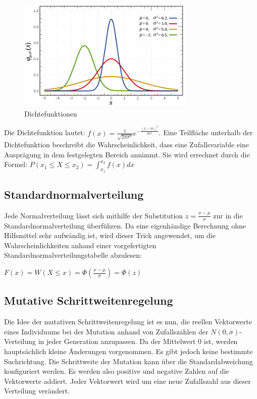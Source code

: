 \begin{figure}[H]
\centering
\includegraphics[width=0.75\textwidth]{img/Glockenkurven.png}
\caption[Dichtefunktionen]{Dichtefunktionen\protect\footnotemark}
\label{fig:glockenkurven}
\end{figure}

Die Dichtefunktion lautet: $f(x) = \frac{1}{\sqrt{2 \pi \sigma^2}} e^{-\frac{(x-m)^2}{2 \sigma^2}}$. Eine Teilfläche unterhalb der Dichtefunktion beschreibt die Wahrscheinlichkeit, dass eine Zufallsvariable eine Ausprägung in dem festgelegten Bereich annimmt. Sie wird errechnet durch die Formel: $P(x_1 \le X \le x_2) = \int_{x_1}^{x_2} f(x) dx$

\subsection{Standardnormalverteilung}

Jede Normalverteilung lässt sich mithilfe der Substitution $z = \frac{x - \mu}{\sigma}$ zur in die Standardnormalverteilung überführen.
Da eine eigenhändige Berechnung ohne Hilfsmittel sehr aufwändig ist, wird dieser Trick angewendet, um die Wahrscheinlichkeiten anhand einer vorgefertigten Standardnormalverteilungstabelle abzulesen:

$F(x) = W(X \le x) = \Phi(\frac{x - \mu}{\sigma}) = \Phi(z)$

\subsection{Mutative Schrittweitenregelung}

Die Idee der mutativen Schrittweitenregelung ist es nun, die reellen Vektorwerte eines Individuums bei der Mutation anhand von Zufallszahlen der $N(0, \sigma)$-Verteilung in jeder Generation anzupassen. Da der Mittelwert $0$ ist, werden hauptsächlich kleine Änderungen vorgenommen. Es gibt jedoch keine bestimmte Suchrichtung. Die Schrittweite der Mutation kann über die Standardabweichung konfiguriert werden. Es werden also positive und negative Zahlen auf die Vektorwerte addiert. Jeder Vektorwert wird um eine neue Zufallszahl aus dieser Verteilung verändert.

